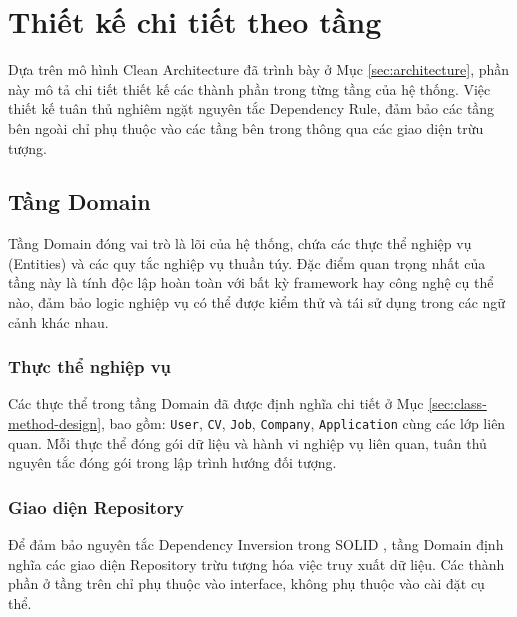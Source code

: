 \section{Thiết kế chi tiết theo tầng}
\label{sec:layered-design}

Dựa trên mô hình Clean Architecture đã trình bày ở Mục \ref{sec:architecture}, phần này mô tả chi tiết thiết kế các thành phần trong từng tầng của hệ thống. Việc thiết kế tuân thủ nghiêm ngặt nguyên tắc Dependency Rule, đảm bảo các tầng bên ngoài chỉ phụ thuộc vào các tầng bên trong thông qua các giao diện trừu tượng.

\subsection{Tầng Domain}
\label{subsec:domain-layer-design}

Tầng Domain đóng vai trò là lõi của hệ thống, chứa các thực thể nghiệp vụ (Entities) và các quy tắc nghiệp vụ thuần túy. Đặc điểm quan trọng nhất của tầng này là tính độc lập hoàn toàn với bất kỳ framework hay công nghệ cụ thể nào, đảm bảo logic nghiệp vụ có thể được kiểm thử và tái sử dụng trong các ngữ cảnh khác nhau.

\subsubsection{Thực thể nghiệp vụ}

Các thực thể trong tầng Domain đã được định nghĩa chi tiết ở Mục \ref{sec:class-method-design}, bao gồm: \texttt{User}, \texttt{CV}, \texttt{Job}, \texttt{Company}, \texttt{Application} cùng các lớp liên quan. Mỗi thực thể đóng gói dữ liệu và hành vi nghiệp vụ liên quan, tuân thủ nguyên tắc đóng gói trong lập trình hướng đối tượng.

\subsubsection{Giao diện Repository}

Để đảm bảo nguyên tắc Dependency Inversion trong SOLID \cite{martin2003agile}, tầng Domain định nghĩa các giao diện Repository trừu tượng hóa việc truy xuất dữ liệu. Các thành phần ở tầng trên chỉ phụ thuộc vào interface, không phụ thuộc vào cài đặt cụ thể.

